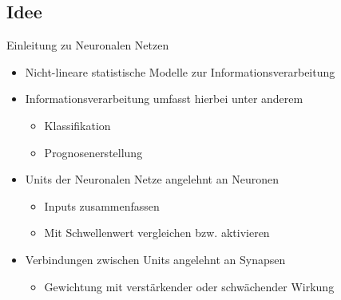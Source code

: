 \documentclass{beamer}
\begin{document}
\subsection{Idee}
\begin{frame}[t]{Einleitung zu Neuronalen Netzen}\vspace{4pt}
\begin{center}
\begin{itemize}
\large\item[] Nicht-lineare statistische Modelle zur Informationsverarbeitung
\large\item[] Informationsverarbeitung umfasst hierbei unter anderem
\begin{itemize}
\item[] Klassifikation
\item[] Prognosenerstellung
\end{itemize}
\large\item[] Units der Neuronalen Netze angelehnt an Neuronen
\begin{itemize}
\item[] Inputs zusammenfassen
\item[] Mit Schwellenwert vergleichen bzw. aktivieren
\end{itemize}
\large\item[] Verbindungen zwischen Units angelehnt an Synapsen
\begin{itemize}
\item[] Gewichtung mit verstärkender oder schwächender Wirkung
\end{itemize}
\end{itemize}
\end{center}
\end{frame}

    
\end{document}
